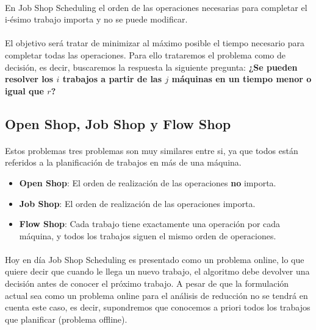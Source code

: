 \documentclass[11pt, a4paper,spanish]{article}
\begin{document}
				\paragraph{}
				En Job Shop Scheduling el orden de las operaciones necesarias para completar el i-ésimo trabajo importa y no se puede modificar.
			 
				\paragraph{}
				El objetivo será tratar de minimizar al máximo posible el tiempo necesario para completar todas las operaciones. Para ello trataremos el problema como de decisión, es decir, buscaremos la respuesta la siguiente pregunta:  
				\newline
				{ \bf ¿Se pueden resolver los $i$ trabajos a partir de las $j$ máquinas en un tiempo menor o igual que $r$?}
				
			\subsection{Open Shop, Job Shop y Flow Shop}
			
				\paragraph{}
				Estos problemas tres problemas son muy similares entre si, ya que todos están referidos a la planificación de trabajos en más de una máquina.
				
				\begin{itemize}
				
					\item {\bf Open Shop}: El orden de realización de las operaciones {\bf no} importa.
					
					\item {\bf Job Shop}: El orden de realización de las operaciones importa.
					
					\item {\bf Flow Shop}: Cada trabajo tiene exactamente una operación por cada máquina, y todos los trabajos siguen el mismo orden de operaciones.
					
				\end{itemize}
				
			\paragraph{}
			Hoy en día Job Shop Scheduling es presentado como un problema online, lo que quiere decir que cuando le llega un nuevo trabajo, el algoritmo debe devolver una decisión antes de conocer el próximo trabajo. A pesar de que la formulación actual sea como un problema online para el análisis de reducción no se tendrá en cuenta este caso, es decir, supondremos que conocemos a priori todos los trabajos que planificar (problema offline).
					
\end{document}

